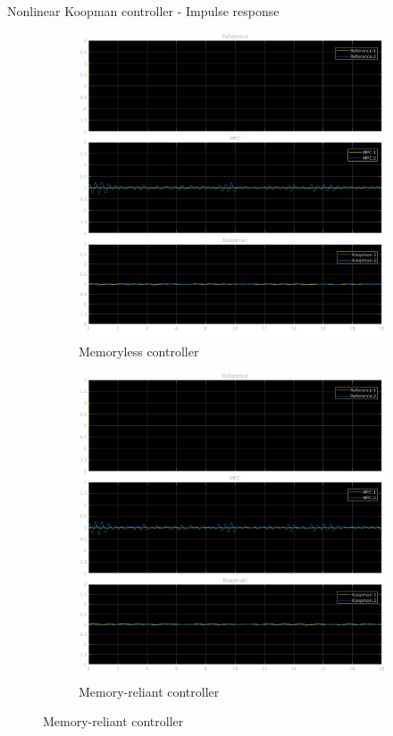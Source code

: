 \documentclass{beamer}
\begin{document}
\begin{frame}{Nonlinear Koopman controller - Impulse response}
    \begin{figure}
        \centering
        \begin{subfigure}[b]{0.45\textwidth}
            \centering
            \includegraphics[width=\textwidth]{Undelayed_Koopman_Pulse.png}
            \caption{Memoryless controller}
        \end{subfigure}
        \hfill
        \begin{subfigure}[b]{0.45\textwidth}
            \centering
            \includegraphics[width=\textwidth]{Delayed_Koopman_Pulse.png}
            \caption{Memory-reliant controller}
        \end{subfigure}
    \end{figure}
\end{frame}
\end{document}
